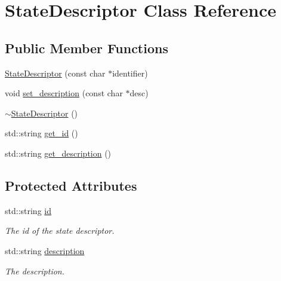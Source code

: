 \hypertarget{class_state_descriptor}{
\section{\-State\-Descriptor \-Class \-Reference}
\label{class_state_descriptor}
}
\subsection*{\-Public \-Member \-Functions}
\begin{DoxyCompactItemize}
\item 
\hyperlink{class_state_descriptor_afc148468d8cd45e8a109a9ed887ef729}{\-State\-Descriptor} (const char $\ast$identifier)
\item 
void \hyperlink{class_state_descriptor_a58265248efa7a27af7e6bbddeab1d74a}{set\-\_\-description} (const char $\ast$desc)
\item 
\hyperlink{class_state_descriptor_a2d9dfc3ddc8c8c4f609f4ff42e8e2bea}{$\sim$\-State\-Descriptor} ()
\item 
std\-::string \hyperlink{class_state_descriptor_a86c0070f308c636a19693a009f0a5464}{get\-\_\-id} ()
\item 
std\-::string \hyperlink{class_state_descriptor_affa74bf68afccd61d263bbbb4b9419ea}{get\-\_\-description} ()
\end{DoxyCompactItemize}
\subsection*{\-Protected \-Attributes}
\begin{DoxyCompactItemize}
\item 
\hypertarget{class_state_descriptor_a6e9e403fcf97cda1dc40bda6428af294}{
std\-::string \hyperlink{class_state_descriptor_a6e9e403fcf97cda1dc40bda6428af294}{id}}
\label{class_state_descriptor_a6e9e403fcf97cda1dc40bda6428af294}

\begin{DoxyCompactList}\small\item\em \-The id of the state descriptor. \end{DoxyCompactList}\item 
\hypertarget{class_state_descriptor_ae1f4cb2426dd97e0afe6d036c9cd9913}{
std\-::string \hyperlink{class_state_descriptor_ae1f4cb2426dd97e0afe6d036c9cd9913}{description}}
\label{class_state_descriptor_ae1f4cb2426dd97e0afe6d036c9cd9913}

\begin{DoxyCompactList}\small\item\em \-The description. \end{DoxyCompactList}\end{DoxyCompactItemize}


